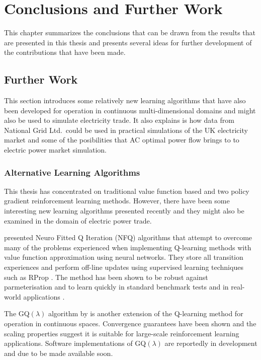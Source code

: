 \chapter{Conclusions and Further Work}
\label{ch:conclusion}
This chapter summarizes the conclusions that can be drawn from the
results that are presented in this thesis and presents several ideas for
further development of the contributions that have been made.

\section{Further Work}
\label{sec:furtherwork}
This section introduces some relatively new learning algorithms that have
also been developed for operation in continuous multi-dimensional domains and
might also be used to simulate electricity trade.
It also explains is how data from National Grid Ltd.~could be used in practical
simulations of the UK electricity market and some of the posibilities that AC
optimal power flow brings to to electric power market simulation.

\subsection{Alternative Learning Algorithms}
This thesis has concentrated on traditional value function based and two policy
gradient reinforcement learning methods.  However, there have been some
interesting new learning algorithms presented recently and they might also be
examined in the domain of electric power trade.

 presented Neuro Fitted Q Iteration (NFQ) algorithms
that attempt to overcome many of the problems experienced when implementing
Q-learning methods with value function approximation using neural networks.
They store all transition experiences and perform off-line updates using
supervised learning techniques such as RProp \cite{riedmiller93}.  The method
has been shown to be robust against parmeterisation and to learn quickly in
standard benchmark tests and in real-world applications \cite{kietzmann09}.

The GQ$(\lambda)$ algorithm by  is another extension of the
Q-learning method for operation in continuous spaces.  Convergence guarantees
have been shown and the scaling properties suggest it is suitable for large-scale reinforcement learning
applications.  Software implementations of GQ$(\lambda)$ are reportedly in
development and due to be made available soon.

